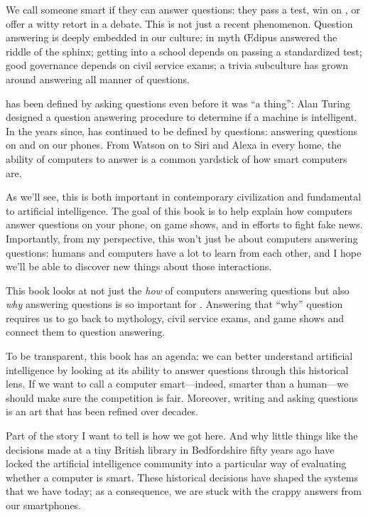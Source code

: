 We call someone smart if they can answer questions: they pass a test, win
on \jeopardy{}, or offer a witty retort in a debate.
%
This is not just a recent phenomenon.
%
Question answering is deeply embedded in
our culture:
%
in myth \OE{}dipus answered the riddle of the sphinx;
%
getting into a school depends on passing a standardized test;
%
good governance depends on civil service exams;
%
a trivia subculture has grown around answering all manner of questions.

 has been defined by asking questions even before it was ``a
thing'': Alan Turing designed a question answering procedure to
determine if a machine is intelligent.
%
In the years since,  has continued to be defined by questions:
answering questions on \jeopardy{} and on our phones.
%
From  Watson on \jeopardy{} to Siri and Alexa in every home, the ability of
computers to answer is a common yardstick of how smart computers are.

As we’ll see, this is both important in contemporary civilization and
fundamental to artificial intelligence.  The goal of this book is to help
explain how computers answer questions on your phone, on game shows, and in
efforts to fight fake news.  Importantly, from my perspective, this won’t just be about
computers answering questions: humans and computers have a lot to learn from
each other, and I hope we’ll be able to discover new things about those
interactions.

This book looks at not just the \emph{how} of computers answering
questions but also \emph{why} answering questions is so important
for .
%
Answering that ``why'' question requires us to go back to
mythology, civil service exams, and game shows and connect them
to  question answering.

To be transparent, this book has an agenda: we can better understand
artificial intelligence by looking at its ability to answer questions
through this historical lens.
%
If we want to call a computer smart---indeed, smarter than a
human---we should make sure the competition is fair.
%
Moreover, writing and asking questions is an art that has been refined
over decades.

Part of the story I want to tell is how we got here.
%
And why little things like the decisions made at a tiny British
library in Bedfordshire fifty years ago have locked the artificial
intelligence community into a particular way of evaluating whether a
computer is smart.
%
These historical decisions have shaped the systems that we have today;
as a consequence, we are stuck with the crappy answers from our
smartphones.


